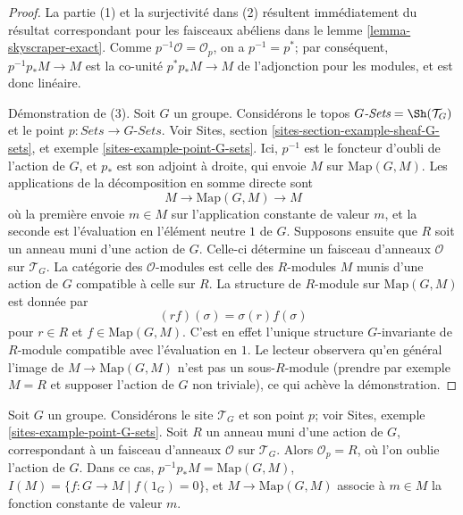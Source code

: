 \begin{proof}
La partie (1) et la surjectivité dans (2) résultent immédiatement du résultat
correspondant pour les faisceaux abéliens dans le
lemme \ref{lemma-skyscraper-exact}. Comme
$p^{-1}\mathcal{O} = \mathcal{O}_p$, on a $p^{-1} = p^*$; par conséquent,
$p^{-1}p_*M \to M$ est la co-unité $p^*p_*M \to M$ de l'adjonction pour les
modules, et est donc linéaire.

\medskip\noindent
Démonstration de (3). Soit $G$ un groupe. Considérons le topos
$G\textit{-Sets} = \Sh(\mathcal{T}_G)$
et le point $p : \textit{Sets} \to G\textit{-Sets}$. Voir Sites,
section \ref{sites-section-example-sheaf-G-sets}, et
exemple \ref{sites-example-point-G-sets}. Ici, $p^{-1}$ est le foncteur
d'oubli de l'action de $G$, et $p_*$ est son adjoint à droite, qui envoie
$M$ sur $\text{Map}(G, M)$. Les applications de la décomposition en somme
directe sont
$$
M \to \text{Map}(G, M) \to M
$$
où la première envoie $m \in M$ sur l'application constante de valeur $m$, et
la seconde est l'évaluation en l'élément neutre $1$ de $G$.
Supposons ensuite que $R$ soit un anneau muni d'une action de $G$. Celle-ci
détermine un faisceau d'anneaux $\mathcal{O}$ sur $\mathcal{T}_G$. La catégorie
des $\mathcal{O}$-modules est celle des $R$-modules $M$ munis d'une action de
$G$ compatible à celle sur $R$. La structure de $R$-module sur
$\text{Map}(G, M)$ est donnée par
$$
( r f ) (\sigma) = \sigma(r) f(\sigma)
$$
pour $r \in R$ et $f \in \text{Map}(G, M)$. C'est en effet l'unique structure
$G$-invariante de $R$-module compatible avec l'évaluation en $1$. Le lecteur
observera qu'en général l'image de $M \to \text{Map}(G, M)$ n'est pas un
sous-$R$-module (prendre par exemple $M = R$ et supposer l'action de $G$ non
triviale), ce qui achève la démonstration.
\end{proof}

\begin{example}
\label{example-ring-with-group-action}
Soit $G$ un groupe. Considérons le site $\mathcal{T}_G$ et son point $p$;
voir Sites, exemple \ref{sites-example-point-G-sets}. Soit $R$ un anneau muni
d'une action de $G$, correspondant à un faisceau d'anneaux $\mathcal{O}$ sur
$\mathcal{T}_G$. Alors $\mathcal{O}_p = R$, où l'on oublie l'action de $G$.
Dans ce cas, $p^{-1}p_*M = \text{Map}(G, M)$,
$I(M) = \{f : G \to M \mid f(1_G) = 0\}$, et
$M \to \text{Map}(G, M)$ associe à $m \in M$ la fonction constante de valeur $m$.
\end{example}




